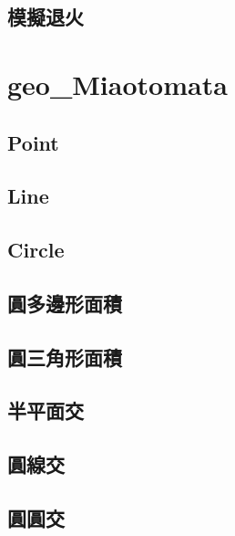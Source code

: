\documentclass[a4paper,10pt,twocolumn,oneside]{article}
\begin{document}
\subsection{模擬退火}
   
\section{geo_Miaotomata}
    \subsection{Point}
    

    \subsection{Line}
    

    \subsection{Circle}
    

    \subsection{圓多邊形面積}
    

    \subsection{圓三角形面積}
    

    \subsection{半平面交}
    

    \subsection{圓線交}
    

    \subsection{圓圓交}
    
\end{document}
